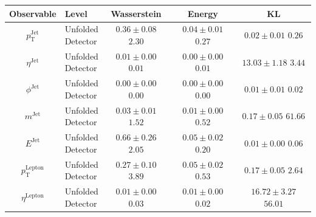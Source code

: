 \begin{tabular}{cl|ccc}
  \toprule
  Observable & Level & Wasserstein & Energy & KL \\
  \midrule
  $p_\mathrm{T}^\mathrm{Jet}$ & \makecell[l]{Unfolded \\ Detector} & \makecell[l]{$0.36 \pm 0.08$ \\ $2.30$} & \makecell[l]{$0.04 \pm 0.01$ \\ $0.27$} & \makecell[l]{$0.02 \pm 0.01$ \\ $0.26$}\\
  \midrule
  $\eta^\mathrm{Jet}$ & \makecell[l]{Unfolded \\ Detector} & \makecell[l]{$0.01 \pm 0.00$ \\ $0.01$} & \makecell[l]{$0.00 \pm 0.00$ \\ $0.01$} & \makecell[l]{$13.03 \pm 1.18$ \\ $3.44$}\\
  \midrule
  $\phi^\mathrm{Jet}$ & \makecell[l]{Unfolded \\ Detector} & \makecell[l]{$0.00 \pm 0.00$ \\ $0.00$} & \makecell[l]{$0.00 \pm 0.00$ \\ $0.00$} & \makecell[l]{$0.01 \pm 0.01$ \\ $0.02$}\\
  \midrule
  $m^\mathrm{Jet}$ & \makecell[l]{Unfolded \\ Detector} & \makecell[l]{$0.03 \pm 0.01$ \\ $1.52$} & \makecell[l]{$0.01 \pm 0.00$ \\ $0.52$} & \makecell[l]{$0.17 \pm 0.05$ \\ $61.66$}\\
  \midrule
  $E^\mathrm{Jet}$ & \makecell[l]{Unfolded \\ Detector} & \makecell[l]{$0.66 \pm 0.26$ \\ $2.05$} & \makecell[l]{$0.05 \pm 0.02$ \\ $0.20$} & \makecell[l]{$0.01 \pm 0.00$ \\ $0.06$}\\
  \midrule\midrule
  $p_\mathrm{T}^\mathrm{Lepton}$ & \makecell[l]{Unfolded \\ Detector} & \makecell[l]{$0.27 \pm 0.10$ \\ $3.89$} & \makecell[l]{$0.05 \pm 0.02$ \\ $0.53$} & \makecell[l]{$0.17 \pm 0.05$ \\ $2.64$}\\
  \midrule
  $\eta^\mathrm{Lepton}$ & \makecell[l]{Unfolded \\ Detector} & \makecell[l]{$0.01 \pm 0.00$ \\ $0.03$} & \makecell[l]{$0.01 \pm 0.00$ \\ $0.02$} & \makecell[l]{$16.72 \pm 3.27$ \\ $56.01$}\\

\end{tabular}
